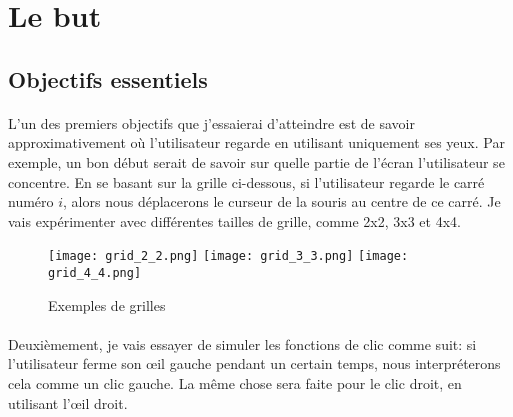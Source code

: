 \section{Le but}
\subsection{Objectifs essentiels}
\paragraph{}
\label{chapter-introduction-first-objective}
L'un des premiers objectifs que j'essaierai d'atteindre est de savoir approximativement où l'utilisateur regarde en utilisant uniquement ses yeux.
Par exemple, un bon début serait de savoir sur quelle partie de l'écran l'utilisateur se concentre.
En se basant sur la grille ci-dessous, si l'utilisateur regarde le carré numéro $i$, alors nous déplacerons le curseur de la souris au centre de ce carré.
Je vais expérimenter avec différentes tailles de grille, comme 2x2, 3x3 et 4x4.

\begin{figure}[H]
    \centering
    \texttt{[image: grid\_2\_2.png]}
    \texttt{[image: grid\_3\_3.png]}
    \texttt{[image: grid\_4\_4.png]}
    \caption{Exemples de grilles}
    \label{grid-example}
\end{figure}

\paragraph{}
Deuxièmement, je vais essayer de simuler les fonctions de clic comme suit: si l'utilisateur ferme son œil gauche pendant un certain temps, nous interpréterons cela comme un clic gauche.
La même chose sera faite pour le clic droit, en utilisant l'œil droit.

